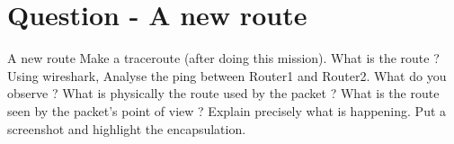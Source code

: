 \section{Question - A new route}

\begin{questionBox}{A new route}
    Make a traceroute (after doing this mission). What is the route ? Using wireshark, Analyse the ping between Router1 and Router2. What do you observe ? What is physically the route used by the packet ? What is the route seen by the packet’s point of view ? Explain precisely what is happening. Put a screenshot and highlight the encapsulation.
\end{questionBox}

